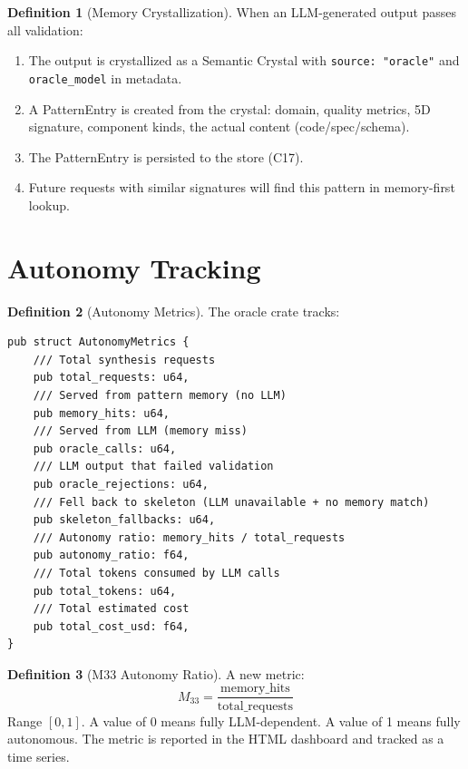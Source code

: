 \documentclass[11pt,a4paper,twoside]{article}
\theoremstyle{definition}
\newtheorem{definition}{Definition}[section]
\theoremstyle{plain}
\theoremstyle{remark}
\begin{document}
\begin{definition}[Memory Crystallization]\label{def:memcrystal}
When an LLM-generated output passes all validation:
\begin{enumerate}[nosep,label=(\roman*)]
  \item The output is crystallized as a Semantic Crystal with
        \texttt{source: "oracle"} and \texttt{oracle\_model} in
        metadata.
  \item A PatternEntry is created from the crystal:
        domain, quality metrics, 5D signature, component kinds,
        the actual content (code/spec/schema).
  \item The PatternEntry is persisted to the store (C17).
  \item Future requests with similar signatures will find this
        pattern in memory-first lookup.
\end{enumerate}
\end{definition}


\section{Autonomy Tracking}\label{sec:autonomy}

\begin{definition}[Autonomy Metrics]\label{def:autometrics}
The oracle crate tracks:
\begin{lstlisting}
pub struct AutonomyMetrics {
    /// Total synthesis requests
    pub total_requests: u64,
    /// Served from pattern memory (no LLM)
    pub memory_hits: u64,
    /// Served from LLM (memory miss)
    pub oracle_calls: u64,
    /// LLM output that failed validation
    pub oracle_rejections: u64,
    /// Fell back to skeleton (LLM unavailable + no memory match)
    pub skeleton_fallbacks: u64,
    /// Autonomy ratio: memory_hits / total_requests
    pub autonomy_ratio: f64,
    /// Total tokens consumed by LLM calls
    pub total_tokens: u64,
    /// Total estimated cost
    pub total_cost_usd: f64,
}
\end{lstlisting}
\end{definition}

\begin{definition}[M33 Autonomy Ratio]\label{def:m33}
A new metric:
\[
  M_{33} = \frac{\mathrm{memory\_hits}}{\mathrm{total\_requests}}
\]
Range $[0, 1]$. A value of 0 means fully LLM-dependent. A value of 1
means fully autonomous. The metric is reported in the HTML dashboard
and tracked as a time series.
\end{definition}
\end{document}
